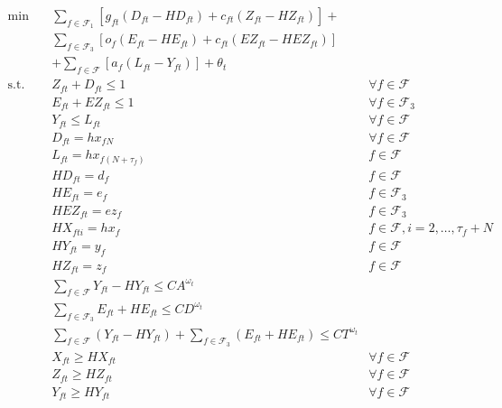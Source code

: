 \documentclass[12pt]{article}
\begin{document}
	\begin{subequations}
		\begin{align}
			\min \quad & \sum_{f \in \mathcal{F}_1} \left[ g_{ft} (D_{ft} - HD_{ft}) + c_{ft} (Z_{ft} - HZ_{ft}) \right]  + & \nonumber \\
			& \sum_{f \in \mathcal{F}_3} \left[ o_f(E_{ft} - HE_{ft}) + c_{ft}(EZ_{ft} - HEZ_{ft}) \right]& \nonumber\\ 
			& +\sum_{f \in \mathcal{F}} \left[ a_f (L_{ft} - Y_{ft})\right]  + \theta_t &\\
			\text{s.t.} \quad & Z_{ft} + D_{ft} \leq 1 & \forall f \in \mathcal{F} \label{cons:cancelORTOtr}\\
			& E_{ft} + EZ_{ft} \leq 1 & \forall f \in \mathcal{F}_3 \label{cons:cancelTO2tr}\\
			& Y_{ft} \leq L_{ft} & \forall f \in \mathcal{F} \label{cons:arrlandtr}\\
			& D_{ft} = hx_{fN} & \forall f \in \mathcal{F} \label{cons:TOHisttr1}\\
			& L_{ft} = hx_{f(N+\tau_{f})}& f \in \mathcal{F} \label{cons:landHisttr}\\
			& HD_{ft} = d_{f} & f \in \mathcal{F} \label{cons:TOHisttr2}\\
			& HE_{ft} = e_{f} & f \in \mathcal{F}_3 \label{cons:TO2Histtr}\\
			& HEZ_{ft} = ez_{f} & f \in \mathcal{F}_3 \label{cons:cancelTO2Histtr}\\
			& HX_{fti} = hx_{f} & f \in \mathcal{F}, i = 2, \dots, \tau_{f} + N \label{cons:planHisttr}\\
			& HY_{ft} = y_{f} & f \in \mathcal{F} \label{cons:arrHisttr}\\
			& HZ_{ft} = z_{f} & f \in \mathcal{F} \label{cons:cancelHisttr}\\
			& \sum_{f \in \mathcal{F}} Y_{ft} - HY_{ft} \leq CA^{\omega_t} & \label{cons:arrCaptr}\\
			& \sum_{f \in \mathcal{F}_3} E_{ft} + HE_{ft} \leq CD^{\omega_t} &\label{cons:deptCaptr}\\
			& \sum_{f \in \mathcal{F}} (Y_{ft} - HY_{ft}) + \sum_{f \in \mathcal{F}_3} (E_{ft} + HE_{ft}) \leq CT^{\omega_t} & \label{cons:totCaptr}\\
			& X_{ft} \geq HX_{ft} & \forall f \in \mathcal{F} \label{cons:transXtr}\\
			& Z_{ft} \geq HZ_{ft} & \forall f \in \mathcal{F} \label{cons:transZtr}\\
			& Y_{ft} \geq HY_{ft} & \forall f \in \mathcal{F} \label{cons:transYtr}\\

\end{align}
\end{subequations}
\end{document}
